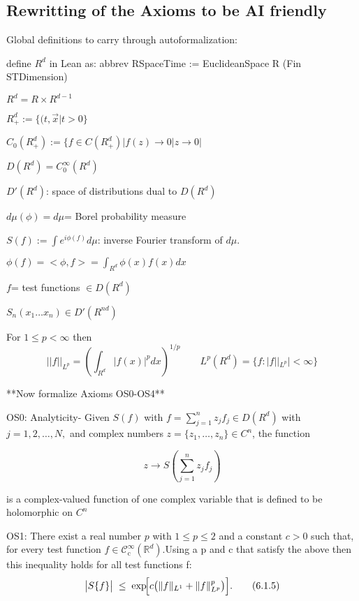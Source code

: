 \documentclass{article}
\newcommand{\1}{\mathbbm{1}}
\theoremstyle{plain}
\theoremstyle{definition}
\numberwithin{equation}{section}
\begin{document}
\subsection{Rewritting of the Axioms to be AI friendly}

Global definitions to carry through autoformalization:

define $R^d$ in Lean as: abbrev RSpaceTime := EuclideanSpace R (Fin STDimension)

$R^d = R \times R^{d-1}$

$R_+^d:= \{(t,\vec{x}| t> 0\}$

$C_0(R_+^d):= \{ f \in C(R_+^d)| f(z) \rightarrow 0 |z \rightarrow 0|$

$D(R^d)= C_0^{\infty} (R^d)$ 

$D'(R^d)$: space of distributions dual to $D(R^d)$

$d \mu (\phi)= d \mu$= Borel probability measure

$S(f):= \int e^{i \phi(f)} d \mu$: inverse Fourier transform of $d \mu$. 

$\phi(f) = < \phi, f>= \int_{R^d }\phi(x) f(x) dx$

$f$= test functions $\in D(R^d)$

$S_n(x_1 \ldots x_n) \in D'(R^{nd})$

For $1 \leq p < \infty$ then
\begin{equation}
    || f ||_{L^p}= (\int_{R^d} |f(x)|^p dx)^{1/p} \qquad L^p(R^d)= \{f: |f||_{L^p}| < \infty \}
\end{equation}

 **Now formalize Axioms OS0-OS4**

OS0: Analyticity-  Given $S (f) $ with $f = \sum_{j=1}^n z_j f_j \in D({R^d})$ with $j= 1,2, \ldots, N, $ and complex numbers $z= \{ z_1, \ldots, z_n\} \in C^n$, the function 

\begin{equation}
    z \rightarrow S (\sum_{j=1}^n  z_j f_j )
\end{equation}

is a complex-valued function of one complex variable that is defined to be holomorphic on $C^n$ 

OS1:
There exist a real number \(p\) with \(1\le p\le 2\) and a constant \(c>0\) such that, for every test function \(f\in\mathcal{C}^{\infty}_{\mathrm c}(\mathbb{R}^{d})\).Using a p and c that satisfy the above then this inequality holds for all test functions f:
\begin{equation}\label{eq:OS1}
\bigl|S\{f\}\bigr|
\;\le\;
\exp\!\Bigl[c\bigl(\|f\|_{L^{1}}+\|f\|_{L^{p}}^p\bigr)\Bigr].
\tag{6.1.5}
\end{equation}
\end{document}
